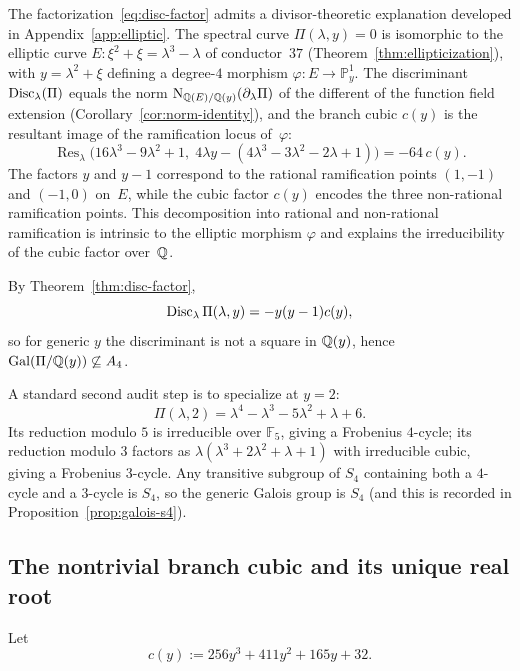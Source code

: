 \begin{remark}\label{rmk:elliptic-origin}
The factorization~\eqref{eq:disc-factor} admits a divisor-theoretic explanation developed in Appendix~\ref{app:elliptic}.
The spectral curve $\Pi(\lambda,y)=0$ is isomorphic to the elliptic curve $E:\xi^2+\xi=\lambda^3-\lambda$ of conductor~$37$ (Theorem~\ref{thm:ellipticization}), with $y=\lambda^2+\xi$ defining a degree-$4$ morphism $\varphi:E\to\mathbb{P}^1_y$.
The discriminant $\operatorname{Disc}_\lambda(\Pi)$ equals the norm $\mathrm{N}_{\mathbb{Q}(E)/\mathbb{Q}(y)}(\partial_\lambda\Pi)$ of the different of the function field extension (Corollary~\ref{cor:norm-identity}), and the branch cubic $c(y)$ is the resultant image of the ramification locus of~$\varphi$:
\[
\operatorname{Res}_\lambda\!\bigl(16\lambda^3-9\lambda^2+1,\;4\lambda y-(4\lambda^3-3\lambda^2-2\lambda+1)\bigr)=-64\,c(y).
\]
The factors $y$ and $y-1$ correspond to the rational ramification points $(1,-1)$ and $(-1,0)$ on~$E$, while the cubic factor $c(y)$ encodes the three non-rational ramification points.
This decomposition into rational and non-rational ramification is intrinsic to the elliptic morphism $\varphi$ and explains the irreducibility of the cubic factor over~$\mathbb{Q}$.
\end{remark}
\begin{remark}\label{rmk:galois-s4-main}
By Theorem~\ref{thm:disc-factor}, 
\[
\operatorname{Disc}_\lambda\Pi(\lambda,y)=-y(y-1)c(y),
\]
so for generic \(y\) the discriminant is not a square in \(\mathbb{Q}(y)\), hence \(\mathrm{Gal}(\Pi/\mathbb{Q}(y))\not\subseteq A_4\).

A standard second audit step is to specialize at \(y=2\):
\[
\Pi(\lambda,2)=\lambda^4-\lambda^3-5\lambda^2+\lambda+6.
\]
Its reduction modulo \(5\) is irreducible over \(\mathbb F_5\), giving a Frobenius \(4\)-cycle; its reduction modulo \(3\) factors as \(\lambda(\lambda^3+2\lambda^2+\lambda+1)\) with irreducible cubic, giving a Frobenius \(3\)-cycle.
Any transitive subgroup of \(S_4\) containing both a \(4\)-cycle and a \(3\)-cycle is \(S_4\), so the generic Galois group is \(S_4\) (and this is recorded in Proposition~\ref{prop:galois-s4}).
\end{remark}

\subsection{The nontrivial branch cubic and its unique real root}

Let
\begin{equation}\label{eq:cubic}
c(y):=256y^3+411y^2+165y+32.
\end{equation}

